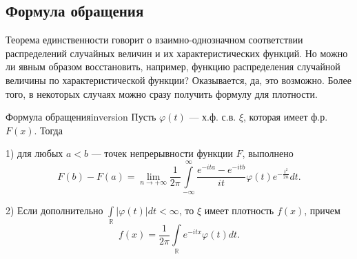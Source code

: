 \vspace{1em}

\subsection{Формула обращения}

Теорема единственности говорит о взаимно-однозначном соответствии распределений случайных величин и их характеристических функций. Но можно ли явным образом восстановить, например, функцию распределения случайной величины по характеристической функции? Оказывается, да, это возможно. Более того, в некоторых случаях можно сразу получить формулу для плотности.

\begin{theorem}{Формула обращения}{inversion}
    Пусть $\varphi(t)$ --- х.ф. с.в. $\xi$, которая имеет ф.р. $F(x)$. Тогда
    
    1) для любых $a < b$ --- точек непрерывности функции $F$, выполнено
    \begin{equation*}
        F(b) - F(a) = \lim_{n \to +\infty} \frac{1}{2\pi} \int\limits_{-\infty}^{\infty} \frac{e^{-ita} - e^{-itb}}{it} \varphi(t) e^{-\frac{t^2}{2n}} dt.
    \end{equation*}
    
    2) Если дополнительно $\int\limits_{\mathbb{R}} |\varphi(t)| dt < \infty$, то $\xi$ имеет плотность $f(x)$, причем
    \begin{equation*}
        f(x) = \frac{1}{2\pi} \int\limits_{\mathbb{R}} e^{-itx} \varphi(t) dt.
    \end{equation*}
\end{theorem}
